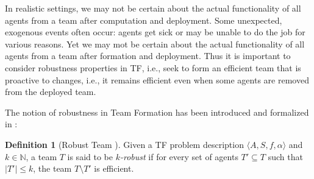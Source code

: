 \documentclass[conference]{IEEEtran}
\theoremstyle{definition}
\newtheorem{definition}{Definition}
\begin{document}
In realistic settings, we may not be certain about the actual functionality of 
all agents from a team after computation and deployment.
Some unexpected, exogenous events often occur:
agents get sick or may be unable to do the job for various reasons.
Yet we may mot be certain about the actual functionality of all agents from a team 
after formation and deployment. Thus it is important to consider robustness properties in TF, 
i.e., seek to form an efficient team that is proactive to changes, i.e., it remains efficient 
even when some agents are removed from the deployed team.

The notion of robustness in Team Formation has been introduced and formalized in \cite{Okimoto2015}:
\begin{definition}[Robust Team \cite{Okimoto2015}]
	Given a TF problem description $\langle A, S, f, \alpha\rangle$ and  $k \in \mathbb{N}$, a team $T$
	is said to be \emph{$k$-robust} if for every set of agents $T' \subseteq T$ such that $|T'| \leq k$, the team $T \setminus T'$ is efficient.
	\label{def:TFrobust}
\end{definition}
\end{document}
